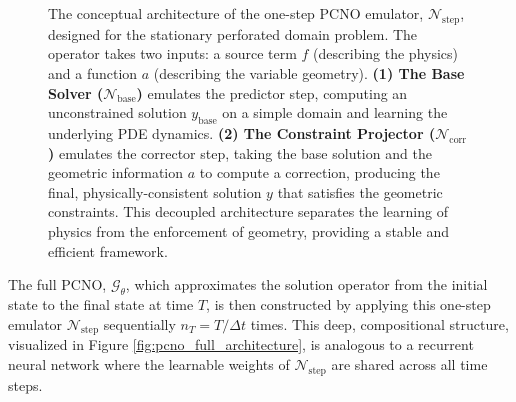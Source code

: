 \documentclass[pdflatex,sn-mathphys-num]{sn-jnl}%
\theoremstyle{thmstyleone}%
\numberwithin{equation}{section}
\begin{document}
\begin{figure}[h!]
\begin{tikzpicture}
    \end{tikzpicture}
    \caption{
        The conceptual architecture of the one-step PCNO emulator, $\mathcal{N}_{\text{step}}$, designed for the stationary perforated domain problem. The operator takes two inputs: a source term $f$ (describing the physics) and a function $a$ (describing the variable geometry). 
        \textbf{(1) The Base Solver ($\mathcal{N}_{\text{base}}$)} emulates the predictor step, computing an unconstrained solution $y_{\text{base}}$ on a simple domain and learning the underlying PDE dynamics. 
        \textbf{(2) The Constraint Projector ($\mathcal{N}_{\text{corr}}$)} emulates the corrector step, taking the base solution and the geometric information $a$ to compute a correction, producing the final, physically-consistent solution $y$ that satisfies the geometric constraints. This decoupled architecture separates the learning of physics from the enforcement of geometry, providing a stable and efficient framework.
    }
    \label{fig:pcno_architecture}
\end{figure}

The full PCNO, $\mathcal{G}_\theta$, which approximates the solution operator from the initial state to the final state at time $T$, is then constructed by applying this one-step emulator $\mathcal{N}_{\text{step}}$ sequentially $n_T = T/\Delta t$ times. This deep, compositional structure, visualized in Figure \ref{fig:pcno_full_architecture}, is analogous to a recurrent neural network where the learnable weights of $\mathcal{N}_{\text{step}}$ are shared across all time steps.
\end{document}
